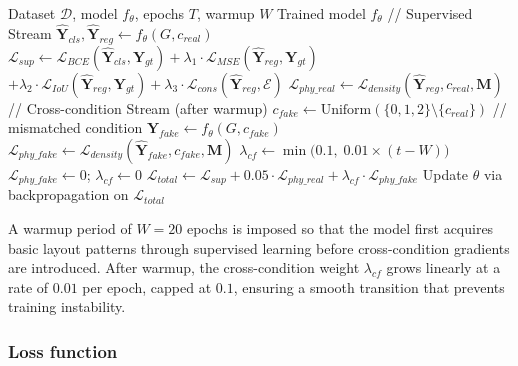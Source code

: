 \begin{algorithm}[t]
\caption{Dual-Stream Training}
\label{alg:dual_stream}
\begin{algorithmic}[1]
\REQUIRE Dataset $\mathcal{D}$, model $f_\theta$, epochs $T$, warmup $W$
\ENSURE Trained model $f_\theta$
        \STATE // Supervised Stream
        \STATE $\hat{\mathbf{Y}}_{cls}, \hat{\mathbf{Y}}_{reg} \leftarrow f_\theta(G, c_{real})$
        \STATE $\mathcal{L}_{sup} \leftarrow \mathcal{L}_{BCE}(\hat{\mathbf{Y}}_{cls}, \mathbf{Y}_{gt}) + \lambda_1 \cdot \mathcal{L}_{MSE}(\hat{\mathbf{Y}}_{reg}, \mathbf{Y}_{gt})$
        \STATE \qquad\qquad $+ \lambda_2 \cdot \mathcal{L}_{IoU}(\hat{\mathbf{Y}}_{reg}, \mathbf{Y}_{gt}) + \lambda_3 \cdot \mathcal{L}_{cons}(\hat{\mathbf{Y}}_{reg}, \mathcal{E})$
        \STATE $\mathcal{L}_{phy\_real} \leftarrow \mathcal{L}_{density}(\hat{\mathbf{Y}}_{reg}, c_{real}, \mathbf{M})$
        \STATE
        \STATE // Cross-condition Stream (after warmup)
            \STATE $c_{fake} \leftarrow \text{Uniform}(\{0,1,2\}\setminus\{c_{real}\})$ \hspace{0.5em} // mismatched condition
            \STATE $\hat{\mathbf{Y}}_{fake} \leftarrow f_\theta(G, c_{fake})$
            \STATE $\mathcal{L}_{phy\_fake} \leftarrow \mathcal{L}_{density}(\hat{\mathbf{Y}}_{fake}, c_{fake}, \mathbf{M})$
            \STATE $\lambda_{cf} \leftarrow \min\bigl(0.1,\; 0.01 \times (t - W)\bigr)$
        \ELSE
            \STATE $\mathcal{L}_{phy\_fake} \leftarrow 0$; \quad $\lambda_{cf} \leftarrow 0$
        \ENDIF
        \STATE
        \STATE $\mathcal{L}_{total} \leftarrow \mathcal{L}_{sup} + 0.05 \cdot \mathcal{L}_{phy\_real} + \lambda_{cf} \cdot \mathcal{L}_{phy\_fake}$
        \STATE Update $\theta$ via backpropagation on $\mathcal{L}_{total}$
    \ENDFOR
\ENDFOR
\end{algorithmic}
\end{algorithm}

A warmup period of $W=20$ epochs is imposed so that the model first acquires basic layout patterns through supervised learning before cross-condition gradients are introduced.
After warmup, the cross-condition weight $\lambda_{cf}$ grows linearly at a rate of $0.01$ per epoch, capped at $0.1$, ensuring a smooth transition that prevents training instability.

\subsubsection{Loss function}

